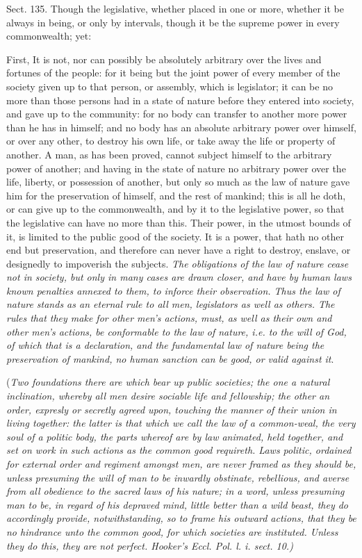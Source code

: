 \documentclass[11pt,openany]{book}
\begin{document}
Sect. 135. Though the legislative, whether placed in one or more, whether it be always in being, or only by intervals, though it be the supreme power in every commonwealth; yet:

First, It is not, nor can possibly be absolutely arbitrary over the lives and fortunes of the people: for it being but the joint power of every member of the society given up to that person, or assembly, which is legislator; it can be no more than those persons had in a state of nature before they entered into society, and gave up to the community: for no body can transfer to another more power than he has in himself; and no body has an absolute arbitrary power over himself, or over any other, to destroy his own life, or take away the life or property of another. A man, as has been proved, cannot subject himself to the arbitrary power of another; and having in the state of nature no arbitrary power over the life, liberty, or possession of another, but only so much as the law of nature gave him for the preservation of himself, and the rest of mankind; this is all he doth, or can give up to the commonwealth, and by it to the legislative power, so that the legislative can have no more than this. Their power, in the utmost bounds of it, is limited to the public good of the society. It is a power, that hath no other end but preservation, and therefore can never have a right to destroy, enslave, or designedly to impoverish the subjects. \emph{The obligations of the law of nature cease not in society, but only in many cases are drawn closer, and have by human laws known penalties annexed to them, to inforce their observation. Thus the law of nature stands as an eternal rule to all men, legislators as well as others. The rules that they make for other men's actions, must, as well as their own and other men's actions, be conformable to the law of nature, i.e. to the will of God, of which that is a declaration, and the fundamental law of nature being the preservation of mankind, no human sanction can be good, or valid against it}.

(\emph{Two foundations there are which bear up public societies; the one a natural inclination, whereby all men desire sociable life and fellowship; the other an order, expresly or secretly agreed upon, touching the manner of their union in living together: the latter is that which we call the law of a common-weal, the very soul of a politic body, the parts whereof are by law animated, held together, and set on work in such actions as the common good requireth. Laws politic, ordained for external order and regiment amongst men, are never framed as they should be, unless presuming the will of man to be inwardly obstinate, rebellious, and averse from all obedience to the sacred laws of his nature; in a word, unless presuming man to be, in regard of his depraved mind, little better than a wild beast, they do accordingly provide, notwithstanding, so to frame his outward actions, that they be no hindrance unto the common good, for which societies are instituted. Unless they do this, they are not perfect. Hooker's Eccl. Pol. l. i. sect. 10.)}
\end{document}
